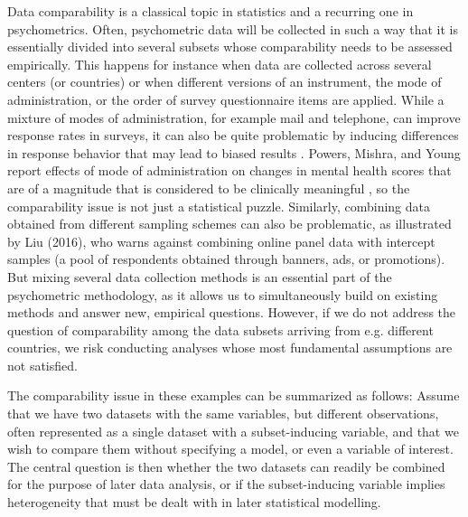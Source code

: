 \documentclass[a4paper,12pt]{article}
\begin{document}
Data comparability is a classical topic in statistics and a recurring one in psychometrics. Often, psychometric data will be collected in such a way that it is essentially divided into several subsets whose comparability needs to be assessed empirically. This happens for instance when data are collected across several centers (or countries) or when different versions of an instrument, the mode of administration, or the order of survey questionnaire items are applied. While a mixture of modes of administration, for example mail and telephone, can improve response rates in surveys, it can also be quite problematic by inducing differences in response behavior that may lead to biased results \cite{Brambilla1987,McHorney1994}. Powers, Mishra, and Young report effects of mode of administration on changes in mental health scores that are of a magnitude that is considered to be clinically meaningful \cite{Powers2005}, so the comparability issue is not just a statistical puzzle. Similarly, combining data obtained from different sampling schemes can also be problematic, as illustrated by Liu (2016), who warns against combining online panel data with intercept samples (a pool of respondents obtained through banners, ads, or promotions).\nocite{Liu2016} But mixing several data collection methods is an essential part of the psychometric methodology, as it allows us to simultaneously build on existing methods and answer new, empirical questions. However, if we do not address the question of comparability among the data subsets arriving from e.g. different countries, we risk conducting analyses whose most fundamental assumptions are not satisfied.

The comparability issue in these examples can be summarized as follows: Assume that we have two datasets with the same variables, but different observations, often represented as a single dataset with a subset-inducing variable, and that we wish to compare them without specifying a model, or even a variable of interest. The central question is then whether the two datasets can readily be combined for the purpose of later data analysis, or if the subset-inducing variable implies heterogeneity that must be dealt with in later statistical modelling.
\end{document}
